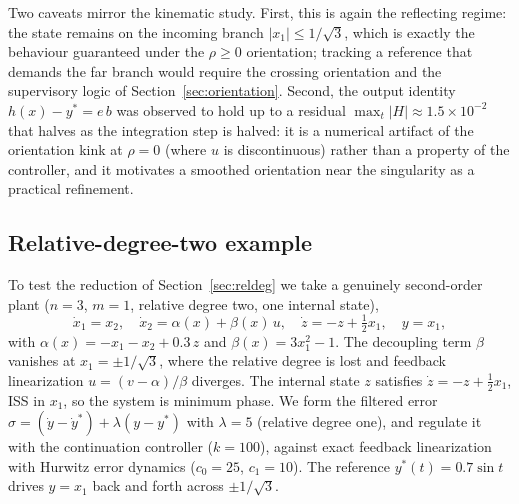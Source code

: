 \documentclass[11pt,american]{article}
\theoremstyle{definition}
\theoremstyle{plain}
\theoremstyle{remark}
\begin{document}
Two caveats mirror the kinematic study. First, this is again the reflecting regime: the state remains on the incoming branch $|x_1| \le 1/\sqrt3$, which is exactly the behaviour guaranteed under the $\rho \ge 0$ orientation; tracking a reference that demands the far branch would require the crossing orientation and the supervisory logic of Section~\ref{sec:orientation}. Second, the output identity $h(x) - y^* = e\,b$ was observed to hold up to a residual $\max_t|H| \approx 1.5\times 10^{-2}$ that halves as the integration step is halved: it is a numerical artifact of the orientation kink at $\rho = 0$ (where $u$ is discontinuous) rather than a property of the controller, and it motivates a smoothed orientation near the singularity as a practical refinement.

\subsection{Relative-degree-two example}\label{sec:rd2}

To test the reduction of Section~\ref{sec:reldeg} we take a genuinely second-order plant ($n=3$, $m=1$, relative degree two, one internal state),
\begin{equation}\label{rd2_example}
\dot x_1 = x_2, \quad \dot x_2 = \alpha(x) + \beta(x)\,u, \quad \dot z = -z + \tfrac12 x_1, \quad y = x_1,
\end{equation}
with $\alpha(x) = -x_1 - x_2 + 0.3\,z$ and $\beta(x) = 3x_1^2 - 1$. The decoupling term $\beta$ vanishes at $x_1 = \pm 1/\sqrt3$, where the relative degree is lost and feedback linearization $u = (v-\alpha)/\beta$ diverges. The internal state $z$ satisfies $\dot z = -z + \tfrac12 x_1$, ISS in $x_1$, so the system is minimum phase. We form the filtered error $\sigma = (\dot y - \dot y^*) + \lambda(y - y^*)$ with $\lambda = 5$ (relative degree one), and regulate it with the continuation controller ($k=100$), against exact feedback linearization with Hurwitz error dynamics ($c_0 = 25$, $c_1 = 10$). The reference $y^*(t) = 0.7\sin t$ drives $y = x_1$ back and forth across $\pm 1/\sqrt3$.
\end{document}
